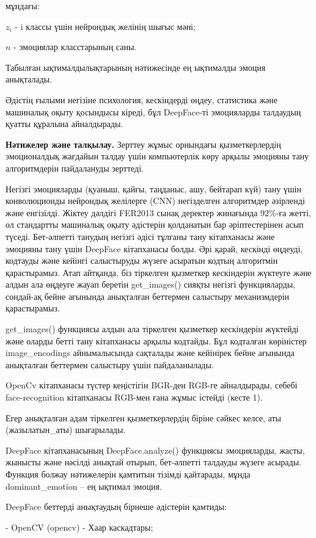 \begin{multicols}{2}
мұндағы:

$z_{i}$ - i классы үшін нейрондық желінің шығыс мәні;

$n$ - эмоциялар класстарының саны.

Табылған ықтималдылықтарының нәтижесінде ең ықтималды эмоция анықталады.

Әдістің ғылыми негізіне психология, кескіндерді өңдеу, статистика және
машиналық оқыту қосындысы кіреді, бұл DeepFace-ті эмоцияларды талдаудың
қуатты құралына айналдырады.

{\bfseries Нәтижелер және талқылау.} Зерттеу жұмыс орнындағы
қызметкерлердің эмоционалдық жағдайын талдау үшін компьютерлік көру
арқылы эмоцияны тану алгоритмдерін пайдалануды зерттеді.

Негізгі эмоцияларды (қуаныш, қайғы, таңданыс, ашу, бейтарап күй) тану
үшін конволюционды нейрондық желілерге (CNN) негізделген алгоритмдер
әзірленді және енгізілді. Жіктеу дәлдігі FER2013 сынақ деректер
жинағында 92\%-ға жетті, ол стандартты машиналық оқыту әдістерін
қолданатын бар әріптестерінен асып түседі. Бет-әлпетті танудың негізгі
әдісі тұлғаны тану кітапханасы және эмоцияны тану үшін DeepFace
кітапханасы болды. Әрі қарай, кескінді өңдеуді, кодтауды және кейінгі
салыстыруды жүзеге асыратын кодтың алгоритмін қарастырамыз. Атап
айтқанда, біз тіркелген қызметкер кескіндерін жүктеуге және алдын ала
өңдеуге жауап беретін get\_images() сияқты негізгі функцияларды,
сондай-ақ бейне ағынында анықталған беттермен салыстыру механизмдерін
қарастырамыз.

get\_images() функциясы алдын ала тіркелген қызметкер кескіндерін
жүктейді және оларды бетті тану кітапханасы арқылы кодтайды. Бұл
кодталған көріністер image\_encodings айнымалысында сақталады және
кейінірек бейне ағынында анықталған беттермен салыстыру үшін
пайдаланылады.

OpenCv кітапханасы түстер кеңістігін BGR-ден RGB-ге айналдырады, себебі
face-recognition кітапханасы RGB-мен ғана жұмыс істейді (кесте 1).

Егер анықталған адам тіркелген қызметкерлердің біріне сәйкес келсе, аты
(жазылатын\_аты) шығарылады.

DeepFace кітапханасының DeepFace.analyze() функциясы эмоцияларды, жасты,
жынысты және нәсілді анықтай отырып, бет-әлпетті талдауды жүзеге
асырады. Функция болжау нәтижелерін қамтитын тізімді қайтарады, мұнда
dominant\_emotion -- ең ықтимал эмоция.

DeepFace беттерді анықтаудың бірнеше әдістерін қамтиды:

- OpenCV (opencv) - Хаар каскадтары;


\end{multicols}
